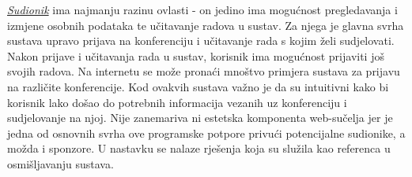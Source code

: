 		\underline{\textit{Sudionik}} ima najmanju razinu ovlasti - on jedino ima mogućnost pregledavanja i izmjene osobnih podataka te učitavanje radova u sustav. Za njega je glavna svrha sustava upravo prijava na konferenciju i učitavanje rada s kojim želi sudjelovati. Nakon prijave i učitavanja rada u sustav, korisnik ima mogućnost prijaviti još svojih radova.
		\newline
		\newline
		Na internetu se može pronaći mnoštvo primjera sustava za prijavu na različite konferencije. Kod ovakvih sustava važno je da su intuitivni kako bi korisnik lako došao do potrebnih informacija vezanih uz konferenciju i sudjelovanje na njoj. Nije zanemariva ni estetska komponenta web-sučelja jer je jedna od osnovnih svrha ove programske potpore privući potencijalne sudionike, a možda i sponzore. U nastavku se nalaze rješenja koja su služila kao referenca u osmišljavanju sustava.
		\newline
		\newline
		
